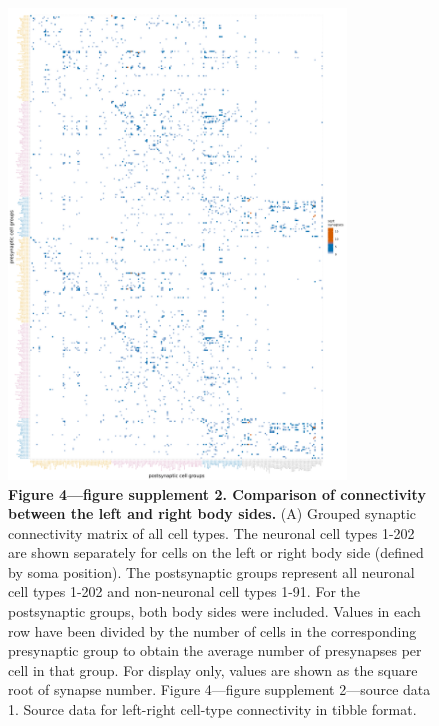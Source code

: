 \documentclass[
  11pt,
]{article}
\begin{document}
\begin{figure}[H]

{\centering \includegraphics[width=0.8\textwidth,height=\textheight]{Figures/Figure4_fig_suppl2.png}

}

\caption{\textbf{Figure 4---figure supplement 2. Comparison of
connectivity between the left and right body sides.} (A) Grouped
synaptic connectivity matrix of all cell types. The neuronal cell types
1-202 are shown separately for cells on the left or right body side
(defined by soma position). The postsynaptic groups represent all
neuronal cell types 1-202 and non-neuronal cell types 1-91. For the
postsynaptic groups, both body sides were included. Values in each row
have been divided by the number of cells in the corresponding
presynaptic group to obtain the average number of presynapses per cell
in that group. For display only, values are shown as the square root of
synapse number. Figure 4---figure supplement 2---source data 1. Source
data for left-right cell-type connectivity in tibble format.}

\end{figure}%
\end{document}
